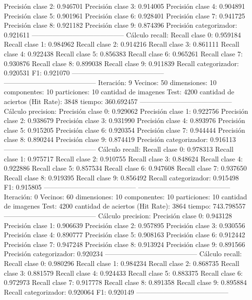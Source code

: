 Precisión clase 2: 0.946701
Precisión clase 3: 0.914005
Precisión clase 4: 0.904891
Precisión clase 5: 0.901961
Precisión clase 6: 0.928401
Precisión clase 7: 0.941725
Precisión clase 8: 0.921182
Precisión clase 9: 0.874396
Precisión categorizador: 0.921611
-----------------------------------------
Cálculo recall: 
Recall clase 0: 0.959184
Recall clase 1: 0.984962
Recall clase 2: 0.914216
Recall clase 3: 0.861111
Recall clase 4: 0.922438
Recall clase 5: 0.856383
Recall clase 6: 0.965261
Recall clase 7: 0.930876
Recall clase 8: 0.899038
Recall clase 9: 0.911839
Recall categorizador: 0.920531
F1: 0.921070
-----------------------------------------
-----------------------------------------
Iteración: 9
Vecinos: 50
dimensiones: 10
componentes: 10
particiones: 10
cantidad de imagenes Test: 4200
cantidad de aciertos (Hit Rate): 3848
tiempo: 360.692457
-----------------------------------------
Cálculo precision: 
Precisión clase 0: 0.929062
Precisión clase 1: 0.922756
Precisión clase 2: 0.938679
Precisión clase 3: 0.931990
Precisión clase 4: 0.893976
Precisión clase 5: 0.915205
Precisión clase 6: 0.920354
Precisión clase 7: 0.944444
Precisión clase 8: 0.890244
Precisión clase 9: 0.874419
Precisión categorizador: 0.916113
-----------------------------------------
Cálculo recall: 
Recall clase 0: 0.978313
Recall clase 1: 0.975717
Recall clase 2: 0.910755
Recall clase 3: 0.848624
Recall clase 4: 0.922886
Recall clase 5: 0.857534
Recall clase 6: 0.947608
Recall clase 7: 0.937650
Recall clase 8: 0.919395
Recall clase 9: 0.856492
Recall categorizador: 0.915498
F1: 0.915805
-----------------------------------------
-----------------------------------------
Iteración: 0
Vecinos: 60
dimensiones: 10
componentes: 10
particiones: 10
cantidad de imagenes Test: 4200
cantidad de aciertos (Hit Rate): 3864
tiempo: 743.798557
-----------------------------------------
Cálculo precision: 
Precisión clase 0: 0.943128
Precisión clase 1: 0.906639
Precisión clase 2: 0.957895
Precisión clase 3: 0.930556
Precisión clase 4: 0.890777
Precisión clase 5: 0.908163
Precisión clase 6: 0.912442
Precisión clase 7: 0.947248
Precisión clase 8: 0.913924
Precisión clase 9: 0.891566
Precisión categorizador: 0.920234
-----------------------------------------
Cálculo recall: 
Recall clase 0: 0.980296
Recall clase 1: 0.984234
Recall clase 2: 0.868735
Recall clase 3: 0.881579
Recall clase 4: 0.924433
Recall clase 5: 0.883375
Recall clase 6: 0.972973
Recall clase 7: 0.917778
Recall clase 8: 0.891358
Recall clase 9: 0.895884
Recall categorizador: 0.920064
F1: 0.920149
-----------------------------------------
